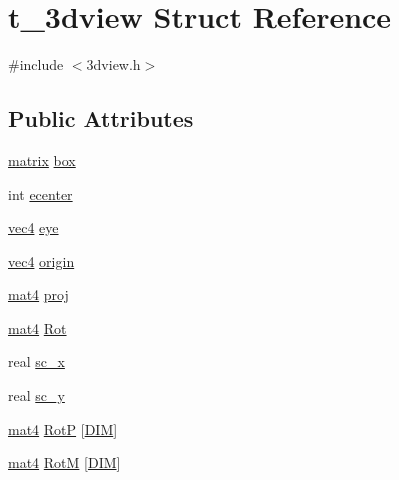 \hypertarget{structt__3dview}{\section{t\-\_\-3dview \-Struct \-Reference}
\label{structt__3dview}
}


{\ttfamily \#include $<$3dview.\-h$>$}

\subsection*{\-Public \-Attributes}
\begin{DoxyCompactItemize}
\item 
\hyperlink{share_2template_2gromacs_2types_2simple_8h_a7ea9c2a830d3f743b887387e33645a83}{matrix} \hyperlink{structt__3dview_a0789fb84f78e6bd29efdd835d676f645}{box}
\item 
int \hyperlink{structt__3dview_a9d92a4c4db66717381a7eccc97a5998a}{ecenter}
\item 
\hyperlink{share_2template_2gromacs_23dview_8h_a6a41fa5ed8bfdf8468a9554d6b1f450c}{vec4} \hyperlink{structt__3dview_a5a8cd754828a61c121679ab62b1be705}{eye}
\item 
\hyperlink{share_2template_2gromacs_23dview_8h_a6a41fa5ed8bfdf8468a9554d6b1f450c}{vec4} \hyperlink{structt__3dview_a732fc76b2ee7c749c73e5a969d0aaf12}{origin}
\item 
\hyperlink{share_2template_2gromacs_23dview_8h_a7dd6f1516961bae8ce5588c5f892554f}{mat4} \hyperlink{structt__3dview_aec5401c7addc72b02a13df26ac0097f9}{proj}
\item 
\hyperlink{share_2template_2gromacs_23dview_8h_a7dd6f1516961bae8ce5588c5f892554f}{mat4} \hyperlink{structt__3dview_a3e18088471be49813b6407f4892e3662}{\-Rot}
\item 
real \hyperlink{structt__3dview_a950f9b435e514664a285cf6522effba2}{sc\-\_\-x}
\item 
real \hyperlink{structt__3dview_a3e94d99210078e12b45ab31247fea8cc}{sc\-\_\-y}
\item 
\hyperlink{share_2template_2gromacs_23dview_8h_a7dd6f1516961bae8ce5588c5f892554f}{mat4} \hyperlink{structt__3dview_a6d8a5f65a6569fbb7ea927d910c7f3cb}{\-Rot\-P} \mbox{[}\hyperlink{share_2template_2gromacs_2types_2simple_8h_ac25189db92959bff3c6c2adf4c34b50a}{\-D\-I\-M}\mbox{]}
\item 
\hyperlink{share_2template_2gromacs_23dview_8h_a7dd6f1516961bae8ce5588c5f892554f}{mat4} \hyperlink{structt__3dview_a6e809b0ef658ee3ad10bba9f9020fd50}{\-Rot\-M} \mbox{[}\hyperlink{share_2template_2gromacs_2types_2simple_8h_ac25189db92959bff3c6c2adf4c34b50a}{\-D\-I\-M}\mbox{]}
\end{DoxyCompactItemize}



